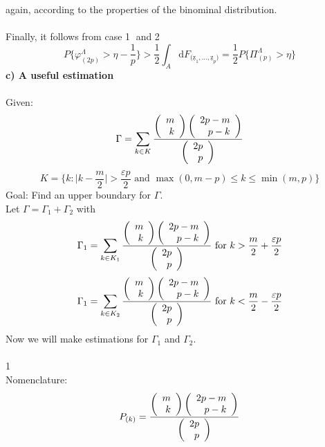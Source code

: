 again, according to the properties of the binominal distribution.\\\\
Finally, it follows from case \textcircled{1} and \textcircled{2}
\begin{equation}
	P\Bigg\{ \varphi_{ (2p) }^\Lambda > \eta - \frac{1}{p} \Bigg\}
	> \frac{1}{2} \int_A \mathrm{d} 
		F_{ \big( \mathrm{\underline{z}}_1, \ldots,
			\mathrm{\underline{z}}_{p} \big) }
	= \frac{1}{2} P\Bigg\{ \Pi_{ (p) }^\Lambda > \eta \Bigg\}
\end{equation}
{\bf c) A useful estimation}
\\\\
Given:
\begin{equation}
	\Gamma = \sum_{ k \in K } 
		\frac{ \rmat{m\\k} \rmat{2p-m\\p-k} }{ \rmat{2p\\p} }
\end{equation}
\begin{equation}
	K = \Bigg\{ k: \Big| k - \frac{m}{2} \Big| > \frac{\varepsilon p}{2}
		\textrm{ and }
		\max(0, m-p) \leq k \leq \min(m, p)
		\Bigg\}
\end{equation}
Goal: Find an upper boundary for $\Gamma$. \\
Let $\Gamma = \Gamma_1 + \Gamma_2$ with
\begin{equation}
	\Gamma_1 = \sum_{ k \in K_1 } 
		\frac{ \rmat{m\\k} \rmat{2p-m\\p-k} }{ \rmat{2p\\p} }
	\textrm{ for } k > \frac{m}{2} + \frac{\varepsilon p}{2}
\end{equation}
\begin{equation}
	\Gamma_1 = \sum_{ k \in K_2 } 
		\frac{ \rmat{m\\k} \rmat{2p-m\\p-k} }{ \rmat{2p\\p} }
	\textrm{ for } k < \frac{m}{2} - \frac{\varepsilon p}{2}
\end{equation}
Now we will make estimations for $\Gamma_1$ and $\Gamma_2$.\\\\
\textcircled{1}\\
Nomenclature:
\begin{equation}
	P_{(k)} = \frac{ \rmat{m\\k} \rmat{2p-m\\p-k} }{ \rmat{2p\\p} }
\end{equation}
